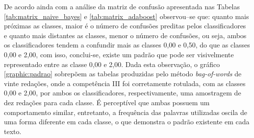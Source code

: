 De acordo ainda com a análise da matriz de confusão apresentada nas Tabelas 
\ref{tab:matrix_naive_bayes} e \ref{tab:matrix_adaboost} observou--se que: 
quanto mais próximas as classes, maior é o número de confusões preditas pelos 
classificadores e quanto mais distantes as classes, menor o número de 
confusões, ou seja, ambos os classificadores tendem a confundir mais as 
classes 0,00 e 0,50, do que as classes 0,00 e 2,00, com isso, conclui-se, 
existe um padrão que pode ser visivelmente representado entre as classe 0,00 e 
2,00. Dada esta observação, o gráfico \ref{graphic:padrao} sobrepõem as tabelas 
produzidas pelo método \textit{bag-of-words} de vinte redações, onde a 
competência III foi corretamente rotulada, com as classes 0,00 e 2,00, por ambos 
os classificadores, respectivamente, uma amostragem de dez redações para cada 
classe. É perceptível que ambas possuem um comportamento similar, entretanto, a 
frequência das palavras utilizadas oscila de uma forma diferente em cada 
classe, o que demonstra o padrão existente em cada texto. 

